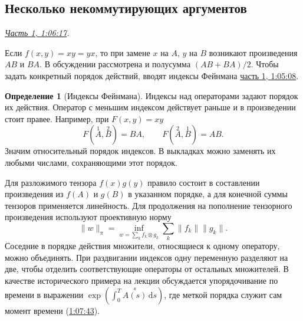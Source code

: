 \documentclass[11pt,a4paper]{article}
\theoremstyle{plain}
\theoremstyle{definition}
\newtheorem{definition}[theorem]{Определение}
\newcommand{\dd}{\,\mathrm d}
\newcommand{\norm}[1]{\lVert#1\rVert}
\newcommand{\at}[3]{\href{https://www.youtube.com/watch?v=#1&t=#2s}{#3}}
\newcommand{\topic}[2]{\Needspace{5\baselineskip}\subsection*{#1}\noindent\emph{#2.}\par\nobreak\smallskip}
\begin{document}
\topic{Несколько некоммутирующих аргументов}{\at{gP2CCEuVufo}{3977}{Часть 1, 1:06:17}}
Если $f(x,y)=xy=yx$, то при замене $x$ на $A$,
$y$ на $B$ возникают произведения $AB$ и $BA$.
В обсуждении рассмотрена и полусумма $(AB+BA)/2$.
Чтобы задать конкретный порядок действий, вводят
индексы Фейнмана \at{gP2CCEuVufo}{3908}{часть 1, 1:05:08}.
\begin{definition}[Индексы Фейнмана]
Индексы над операторами задают порядок их действия.
Оператор с меньшим индексом действует раньше и в
произведении стоит правее. Например, при $F(x,y)=xy$
\[
 F(\overset{1}A,\overset{2}B)=BA,\qquad
 F(\overset{2}A,\overset{1}B)=AB .
\]
Значим относительный порядок индексов. В выкладках можно
заменять их любыми числами, сохраняющими этот порядок.
\end{definition}
Для разложимого тензора $f(x)g(y)$ правило состоит в
составлении произведения из $f(A)$ и $g(B)$ в указанном
порядке, а для конечной суммы тензоров применяется
линейность. Для продолжения на пополнение тензорного
произведения используют проективную норму
\[
 \norm{w}_\pi=\inf_{w=\sum_k f_k\otimes g_k}
                 \sum_k\norm{f_k}\norm{g_k}.
\]
Соседние в порядке действия множители, относящиеся к одному
оператору, можно объединять. При раздвигании индексов одну переменную
разделяют на две, чтобы отделить соответствующие операторы
от остальных множителей. В качестве исторического примера на лекции
обсуждается упорядочивание по времени в выражении
$\exp(\int_0^T\overset{s}{A(s)}\dd s)$, где меткой порядка
служит сам момент времени (\at{gP2CCEuVufo}{4063}{1:07:43}).
\end{document}
